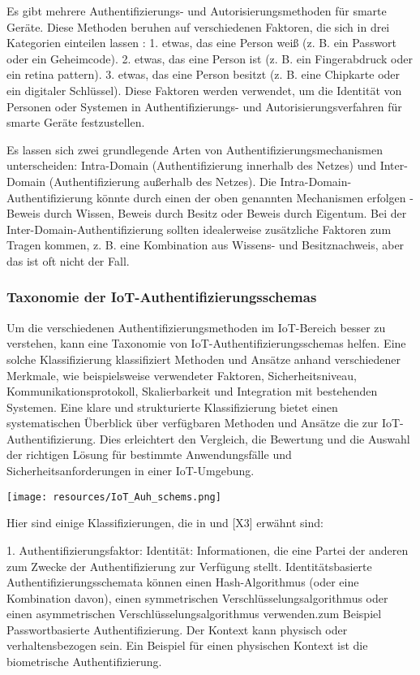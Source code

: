 Es gibt mehrere Authentifizierungs- und Autorisierungsmethoden für smarte Geräte. Diese Methoden beruhen auf verschiedenen Faktoren, die sich in drei Kategorien einteilen lassen \cite{khatoun2022cybersecurity}: 1. etwas, das eine Person weiß (z. B. ein Passwort oder ein Geheimcode). 
2. etwas, das eine Person ist (z. B. ein Fingerabdruck oder ein retina pattern). 
3. etwas, das eine Person besitzt (z. B. eine Chipkarte oder ein digitaler Schlüssel).
Diese Faktoren werden verwendet, um die Identität von Personen oder Systemen in Authentifizierungs- und Autorisierungsverfahren für smarte Geräte festzustellen.


Es lassen sich zwei grundlegende Arten von Authentifizierungsmechanismen unterscheiden: Intra-Domain (Authentifizierung innerhalb des Netzes) und Inter-Domain (Authentifizierung außerhalb des Netzes). Die Intra-Domain-Authentifizierung könnte durch einen der oben genannten Mechanismen erfolgen - Beweis durch Wissen, Beweis durch Besitz oder Beweis durch Eigentum. Bei der Inter-Domain-Authentifizierung sollten idealerweise zusätzliche Faktoren zum Tragen kommen, z. B. eine Kombination aus Wissens- und Besitznachweis, aber das ist oft nicht der Fall.\cite{khatoun2022cybersecurity}


\subsubsection{Taxonomie der IoT-Authentifizierungsschemas}

Um die verschiedenen Authentifizierungsmethoden im IoT-Bereich besser zu verstehen, kann eine Taxonomie von IoT-Authentifizierungsschemas helfen. 
Eine solche Klassifizierung klassifiziert Methoden und Ansätze anhand verschiedener Merkmale, wie beispielsweise verwendeter Faktoren, Sicherheitsniveau, Kommunikationsprotokoll, Skalierbarkeit und Integration mit bestehenden Systemen. Eine klare und strukturierte Klassifizierung bietet einen systematischen Überblick über verfügbaren Methoden und Ansätze die zur IoT-Authentifizierung. Dies erleichtert den Vergleich, die Bewertung und die Auswahl der richtigen Lösung für bestimmte Anwendungsfälle und Sicherheitsanforderungen in einer IoT-Umgebung.

\texttt{[image: resources/IoT\_Auh\_schems.png]}


 Hier sind einige Klassifizierungen, die in \cite{khatoun2022cybersecurity} und [X3] erwähnt sind:

1. Authentifizierungsfaktor:
Identität: Informationen, die eine Partei der anderen zum Zwecke der Authentifizierung zur Verfügung stellt. Identitätsbasierte Authentifizierungsschemata können einen Hash-Algorithmus (oder eine Kombination davon), einen symmetrischen Verschlüsselungsalgorithmus oder einen asymmetrischen Verschlüsselungsalgorithmus verwenden.zum Beispiel Passwortbasierte Authentifizierung. 
Der Kontext kann physisch oder verhaltensbezogen sein. Ein Beispiel für einen physischen Kontext ist die biometrische Authentifizierung. 

